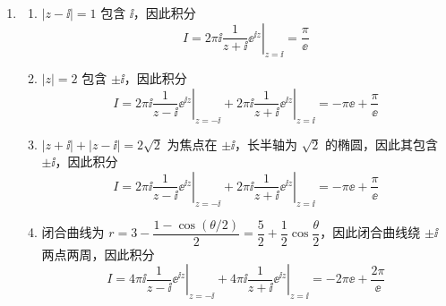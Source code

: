 \begin{question}
\begin{solution}
\begin{enumerate}
\begin{enumerate}
\end{enumerate}
  \item
\begin{enumerate}
  \item \(|z-\ii|=1\) 包含 \(\ii\)，因此积分
\[ I=2\pi\ii \left.\frac{1}{z+\ii}\ee^{\ii z}\right|_{z=\ii}= \frac{\pi}{\ee} \]

  \item \(|z|=2\) 包含 \(\pm\ii\)，因此积分
\[ I=2\pi\ii \left.\frac{1}{z-\ii}\ee^{\ii z}\right|_{z=-\ii}+2\pi\ii \left.\frac{1}{z+\ii}\ee^{\ii z}\right|_{z=\ii}=-\pi\ee+\frac{\pi}{\ee} \]

  \item \(|z+\ii|+|z-\ii|=2\sqrt{2}\) 为焦点在 \(\pm\ii\)，长半轴为 \(\sqrt{2}\) 的椭圆，因此其包含 \(\pm\ii\)，因此积分
\[ I=2\pi\ii \left.\frac{1}{z-\ii}\ee^{\ii z}\right|_{z=-\ii}+2\pi\ii \left.\frac{1}{z+\ii}\ee^{\ii z}\right|_{z=\ii}=-\pi\ee+\frac{\pi}{\ee} \]

  \item 闭合曲线为 \(r=3-\dfrac{1-\cos(\theta/2)}{2}=\dfrac52+\dfrac12\cos\dfrac{\theta}{2}\)，因此闭合曲线绕 \(\pm\ii\) 两点两周，因此积分
\[ I=4\pi\ii \left.\frac{1}{z-\ii}\ee^{\ii z}\right|_{z=-\ii}+4\pi\ii \left.\frac{1}{z+\ii}\ee^{\ii z}\right|_{z=\ii}=-2\pi\ee+\frac{2\pi}{\ee} \]
\end{enumerate}
\end{enumerate}
\end{solution}
\end{question}

